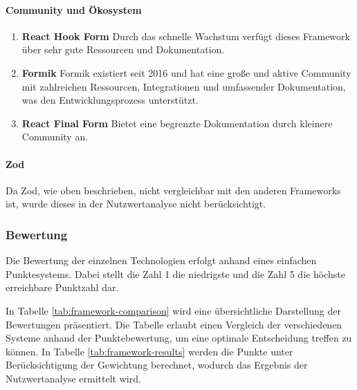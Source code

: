 \paragraph{Community und Ökosystem}
\begin{enumerate}
	\item \textbf{React Hook Form} Durch das schnelle Wachstum verfügt dieses Framework über sehr gute Ressourcen und Dokumentation.
	
	\item \textbf{Formik} Formik existiert seit 2016 und hat eine große und aktive Community mit zahlreichen Ressourcen, Integrationen und umfassender Dokumentation, was den Entwicklungsprozess unterstützt.
	
	\item \textbf{React Final Form} Bietet eine begrenzte Dokumentation durch kleinere Community an.
\end{enumerate}

\paragraph{Zod}
Da Zod, wie oben beschrieben, nicht vergleichbar mit den anderen Frameworks ist, wurde dieses in der Nutzwertanalyse nicht berücksichtigt. \cite{prompt18_pollak}

\subsubsection{Bewertung}
Die Bewertung der einzelnen Technologien erfolgt anhand eines einfachen Punktesystems. Dabei stellt die Zahl 1 die niedrigste und die Zahl 5 die höchste erreichbare Punktzahl dar.

In Tabelle \ref{tab:framework-comparison} wird eine übersichtliche Darstellung der Bewertungen präsentiert. Die Tabelle erlaubt einen Vergleich der verschiedenen Systeme anhand der Punktebewertung, um eine optimale Entscheidung treffen zu können. In Tabelle \ref{tab:framework-results} werden die Punkte unter Berücksichtigung der Gewichtung berechnet, wodurch das Ergebnis der Nutzwertanalyse ermittelt wird.

